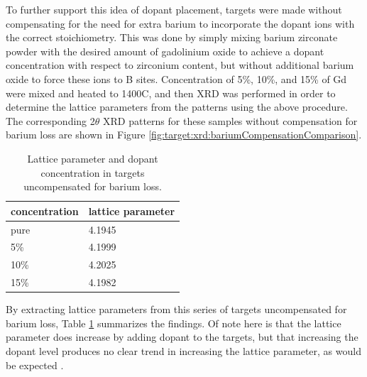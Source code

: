 To further support this idea of dopant placement, targets were made without compensating for the need for extra barium to incorporate the dopant ions with the correct stoichiometry. This was done by simply mixing barium zirconate powder with the desired amount of gadolinium oxide to achieve a dopant concentration with respect to zirconium content, but without additional barium oxide to force these ions to B sites. Concentration of 5\%, 10\%, and 15\% of Gd were mixed and heated to 1400\textdegree C, and then XRD was performed in order to determine the lattice parameters from the patterns using the above procedure. The corresponding 2$\theta$ XRD patterns for these samples without compensation for barium loss are shown in Figure \ref{fig:target:xrd:bariumCompensationComparison}.
\begin{table}[tb]
\caption{Lattice parameter and dopant concentration in targets uncompensated for barium loss.}
\centering
\label{tab:target:xrd:latticeParamVsDopantConcentration}
\begin{tabular}{ll}
\toprule
concentration & lattice parameter \\
\midrule \midrule
pure          & 4.1945            \\
5\%           & 4.1999            \\
10\%          & 4.2025            \\
15\%          & 4.1982            \\
\bottomrule
\end{tabular}
\end{table}
By extracting lattice parameters from this series of targets uncompensated for barium loss, Table \ref{tab:target:xrd:latticeParamVsDopantConcentration} summarizes the findings. Of note here is that the lattice parameter does increase by adding dopant to the targets, but that increasing the dopant level produces no clear trend in increasing the lattice parameter, as would be expected \cite{Fabbri2010c}. 



